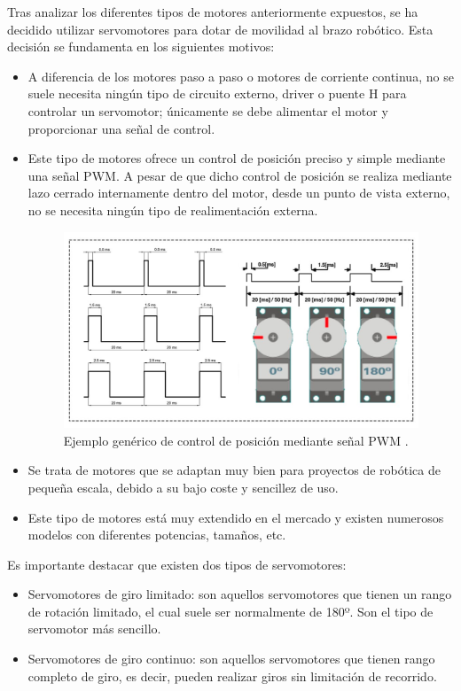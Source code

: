 Tras analizar los diferentes tipos de motores anteriormente expuestos, se ha decidido utilizar servomotores para dotar de movilidad al brazo robótico. Esta decisión se fundamenta en los siguientes motivos:
\begin{itemize}

    \item A diferencia de los motores paso a paso o motores de corriente continua, no se suele necesita ningún tipo de circuito externo, driver o puente H para controlar un servomotor; únicamente se debe alimentar el motor y proporcionar una señal de control.
    
    \item Este tipo de motores ofrece un control de posición preciso y simple mediante una señal \ac{PWM}. A pesar de que dicho control de posición se realiza mediante lazo cerrado internamente dentro del motor, desde un punto de vista externo, no se necesita ningún tipo de realimentación externa.
    
    \begin{figure}[h!]
    \centering 
    \includegraphics[width=.6\linewidth]{pictures/Senal_PWM.jpg}
    \caption{Ejemplo genérico de control de posición mediante señal PWM \cite{ZonaMakerServomotores}.}
    \label{fig:}
    \end{figure}
    
    \item Se trata de motores que se adaptan muy bien para proyectos de robótica de pequeña escala, debido a su bajo coste y sencillez de uso.
    
    \item Este tipo de motores está muy extendido en el mercado y existen numerosos modelos con diferentes potencias, tamaños, etc.
\end{itemize}

Es importante destacar que existen dos tipos de servomotores:
\begin{itemize}
    \item Servomotores de giro limitado: son aquellos servomotores que tienen un rango de rotación limitado, el cual suele ser normalmente de 180º. Son el tipo de servomotor más sencillo.
    \item Servomotores de giro continuo: son aquellos servomotores que tienen rango completo de giro, es decir, pueden realizar giros sin limitación de recorrido.
\end{itemize}

